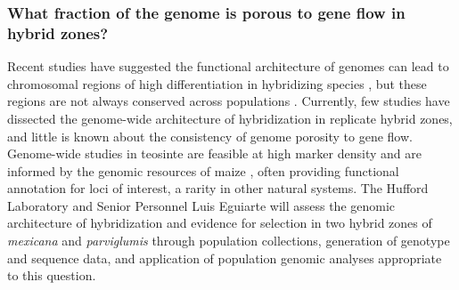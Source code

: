 \subsubsection{What fraction of the genome is porous to gene flow in hybrid zones?}
\label{sss:genomescan}
Recent studies have suggested the functional architecture of genomes can lead to chromosomal regions of high differentiation in hybridizing species \citep{renaut2013}, but these regions are not always conserved across populations \citep{Parchman2013}. Currently, few studies have dissected the genome-wide architecture of hybridization in replicate hybrid zones, and little is known about the consistency of genome porosity to gene flow. Genome-wide studies in teosinte are feasible at high marker density \citep{Hufford2012b, Hufford2013, Pyhajarvi2013} and are informed by the genomic resources of maize \citep{Hufford2012}, often providing functional annotation for loci of interest, a rarity in other natural systems.  The Hufford Laboratory and Senior Personnel Luis Eguiarte will assess the genomic architecture of hybridization and evidence for selection in two hybrid zones of \emph{mexicana} and \emph{parviglumis} through population collections, generation of genotype and sequence data, and application of population genomic analyses appropriate to this question. 

